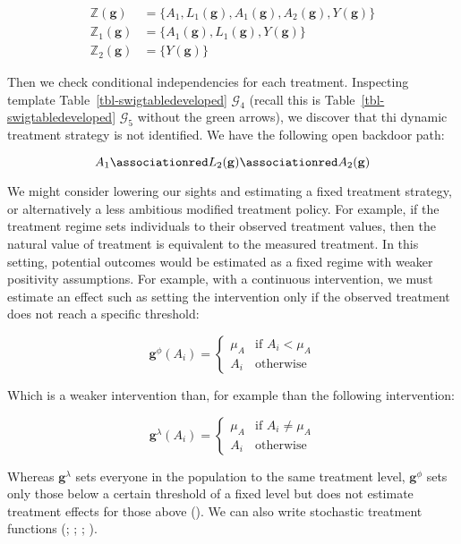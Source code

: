 \documentclass[
  single column]{article}
\begin{document}
\[
\begin{aligned}
\mathbb{Z}(\mathbf{g}) &= \{A_1, L_1(\mathbf{g}), A_1(\mathbf{g}), A_2(\mathbf{g}), Y(\mathbf{g})\} \\
\mathbb{Z}_1(\mathbf{g}) &= \{A_1(\mathbf{g}), L_1(\mathbf{g}), Y(\mathbf{g})\} \\
\mathbb{Z}_2(\mathbf{g}) &= \{Y(\mathbf{g})\}
\end{aligned}
\]

Then we check conditional independencies for each treatment. Inspecting
template Table~\ref{tbl-swigtabledeveloped} \(\mathcal{G}_4\) (recall
this is Table~\ref{tbl-swigtabledeveloped} \(\mathcal{G}_5\) without the
green arrows), we discover that thi dynamic treatment strategy is not
identified. We have the following open backdoor path:

\[
A_1 \associationred L_2(\mathbf{g}) \associationred A_2(\mathbf{g})
\]

We might consider lowering our sights and estimating a fixed treatment
strategy, or alternatively a less ambitious modified treatment policy.
For example, if the treatment regime sets individuals to their observed
treatment values, then the natural value of treatment is equivalent to
the measured treatment. In this setting, potential outcomes would be
estimated as a fixed regime with weaker positivity assumptions. For
example, with a continuous intervention, we must estimate an effect such
as setting the intervention only if the observed treatment does not
reach a specific threshold:

\[
\mathbf{g}^\phi (A_i) = \begin{cases}  \mu_A & \text{if } A_i < \mu_A \\ 
A_i & \text{otherwise} \end{cases}
\]

Which is a weaker intervention than, for example than the following
intervention:

\[
\mathbf{g}^\lambda (A_i) = \begin{cases}   \mu_A  & \text{if } A_i \neq \mu_A   \\ 
A_i & \text{otherwise} \end{cases}
\]

Whereas \(\mathbf{g}^\lambda\) sets everyone in the population to the
same treatment level, \(\mathbf{g}^\phi\) sets only those below a
certain threshold of a fixed level but does not estimate treatment
effects for those above (). We can also write stochastic treatment functions
(;
;
;
).
\end{document}
